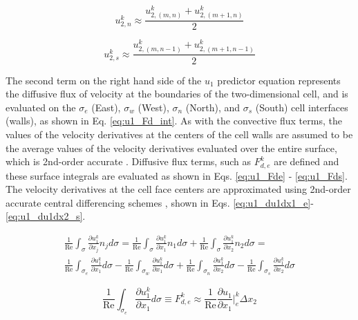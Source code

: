 \documentclass[10pt, letterpaper]{article}
\begin{document}
\begin{equation}
  u_{2,n}^{k} \approx \frac{u_{2,(m,n)}^{k} + u_{2,(m+1,n)}^{k}}{2}
  \label{eq:u1_u2n}
\end{equation}

\begin{equation}
  u_{2,s}^{k} \approx \frac{u_{2,(m,n-1)}^{k} + u_{2,(m+1,n-1)}^{k}}{2}
  \label{eq:u1_u2s}
\end{equation}

The second term on the right hand side of the $u_{1}$ predictor equation represents the diffusive flux of velocity at the boundaries of the two-dimensional cell, and is evaluated on the $\sigma_{e}$ (East), $\sigma_{w}$ (West), $\sigma_{n}$ (North), and $\sigma_{s}$ (South) cell interfaces (walls), as shown in Eq. \ref{eq:u1_Fd_int}. As with the convective flux terms, the values of the velocity derivatives at the centers of the cell walls are assumed to be the average values of the velocity derivatives evaluated over the entire surface, which is 2nd-order accurate \cite{Ferziger_Springer_2002}. Diffusive flux terms, such as $F_{d,e}^{k}$ are defined and these surface integrals are evaluated as shown in Eqs. \ref{eq:u1_Fde} - \ref{eq:u1_Fds}. The velocity derivatives at the cell face centers are approximated using 2nd-order accurate central differencing schemes \cite{Ferziger_Springer_2002}, shown in Eqs. \ref{eq:u1_du1dx1_e}-\ref{eq:u1_du1dx2_s}.

\begin{multline}
  \frac{1}{\text{Re}}\int_{\sigma}\frac{\partial{u_{1}^{k}}}{\partial{x_{j}}}n_{j}d\sigma =
  \frac{1}{\text{Re}}\int_{\sigma}\frac{\partial{u_{1}^{k}}}{\partial{x_{1}}}n_{1}d\sigma + \frac{1}{\text{Re}}\int_{\sigma}\frac{\partial{u_{1}^{k}}}{\partial{x_{2}}}n_{2}d\sigma = \\
  \frac{1}{\text{Re}}\int_{\sigma_{e}}\frac{\partial{u_{1}^{k}}}{\partial{x_{1}}}d\sigma - \frac{1}{\text{Re}}\int_{\sigma_{w}}\frac{\partial{u_{1}^{k}}}{\partial{x_{1}}}d\sigma + \frac{1}{\text{Re}}\int_{\sigma_{n}}\frac{\partial{u_{1}^{k}}}{\partial{x_{2}}}d\sigma - \frac{1}{\text{Re}}\int_{\sigma_{s}}\frac{\partial{u_{1}^{k}}}{\partial{x_{2}}}d\sigma
  \label{eq:u1_Fd_int}
\end{multline}

\begin{equation}
  \frac{1}{\text{Re}}\int_{\sigma_{e}}\frac{\partial{u_{1}^{k}}}{\partial{x_{1}}}d\sigma \equiv
  F_{d,e}^{k} \approx \frac{1}{\text{Re}}\frac{\partial{u_{1}}}{\partial{x_{1}}}\bigg|_{e}^{k}\Delta{x_{2}}
  \label{eq:u1_Fde}
\end{equation}
\end{document}
